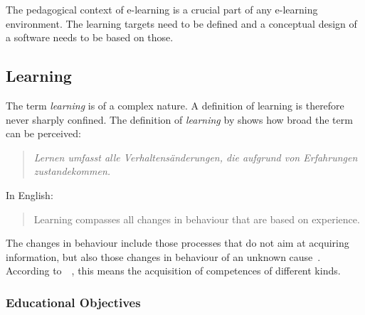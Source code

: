 The pedagogical context of e-learning is a crucial part of any e-learning
environment. The learning targets need to be defined and a conceptual design
of a software needs to be based on those.

\subsection{Learning}
\label{sec:elearn:learning}

The term \emph{learning} is of a complex nature. A definition of learning is
therefore never sharply confined. The definition of \emph{learning} by 
 \citeyear{Lefrancois1994} shows how broad
the term can be perceived:
\begin{quote}
  \emph{Lernen umfasst alle Verhaltensänderungen, 
        die aufgrund von Erfahrungen zustandekommen.}
\end{quote}
In English:
\begin{quote}
 Learning compasses all changes in behaviour that are based on experience.
\end{quote}
The changes in behaviour include those processes that do not aim at acquiring
information, but also those changes in behaviour of an unknown 
cause~. According 
to~~\citeyear{Richert2007},
this means the acquisition of competences of different kinds.

\subsubsection{Educational Objectives}
\label{sec:elearn:learningaims}


